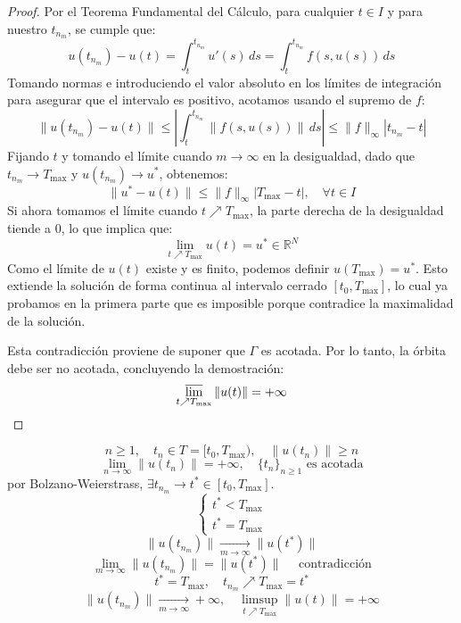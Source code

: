 \begin{proof}
    Por el Teorema Fundamental del Cálculo, para cualquier $t \in I$ y para nuestro $t_{n_m}$, se cumple que:
    \[
        u(t_{n_m}) - u(t) = \int_t^{t_{n_m}} u'(s) \, ds = \int_t^{t_{n_m}} f(s, u(s)) \, ds
    \]
    Tomando normas e introduciendo el valor absoluto en los límites de integración para asegurar que el intervalo es positivo, acotamos usando el supremo de $f$:
    \[
        \| u(t_{n_m}) - u(t) \| \leq \left| \int_t^{t_{n_m}} \| f(s, u(s)) \| \, ds \right| \leq \| f \|_\infty | t_{n_m} - t |
    \]
    Fijando $t$ y tomando el límite cuando $m \to \infty$ en la desigualdad, dado que $t_{n_m} \to T_{\text{max}}$ y $u(t_{n_m}) \to u^*$, obtenemos:
    \[
        \| u^* - u(t) \| \leq \| f \|_\infty | T_{\text{max}} - t |, \quad \forall t \in I
    \]
    Si ahora tomamos el límite cuando $t \nearrow T_{\text{max}}$, la parte derecha de la desigualdad tiende a $0$, lo que implica que:
    \[
        \lim_{t \nearrow T_{\text{max}}} u(t) = u^* \in \mathbb{R}^N
    \]
    Como el límite de $u(t)$ existe y es finito, podemos definir $u(T_{\text{max}}) = u^*$. Esto extiende la solución de forma continua al intervalo cerrado $[t_0, T_{\text{max}}]$, lo cual ya probamos en la primera parte que es imposible porque contradice la maximalidad de la solución.
    
    Esta contradicción proviene de suponer que $\Gamma$ es acotada. Por lo tanto, la órbita debe ser no acotada, concluyendo la demostración:
    \[
        \varlimsup_{t \nearrow T_{\text{max}}} \| u(t) \| = +\infty
    \]
\end{proof}

\[
    n \geq 1, \quad t_n \in T = [t_0, T_{\text{max}}), \quad \| u(t_n) \| \geq n
\]
\[
    \lim_{n \to \infty} \| u(t_n) \| = +\infty, \quad \{t_n\}_{n \geq 1} \text{ es acotada} 
\]
por Bolzano-Weierstrass, $\exists t_{n_m} \to t^* \in [t_0, T_{\text{max}}]$.
\[
    \begin{cases}
        t^* < T_{\text{max}} \\
        t^* = T_{\text{max}}
    \end{cases}
\]
\[
    \| u(t_{n_m}) \| \xrightarrow[m \to \infty]{} \| u(t^*) \| 
\]
\[
    \lim_{m \to \infty} \| u(t_{n_m}) \| = \| u(t^*) \| \quad \text{ contradicción}
\]
\[
    t^* = T_{\text{max}}, \quad t_{n_m} \nearrow T_{\text{max}} = t^*
\]
\[
    \| u(t_{n_m}) \| \xrightarrow[m \to \infty]{} +\infty, \quad \limsup_{t \nearrow T_{\text{max}}} \| u(t) \| = +\infty
\]


